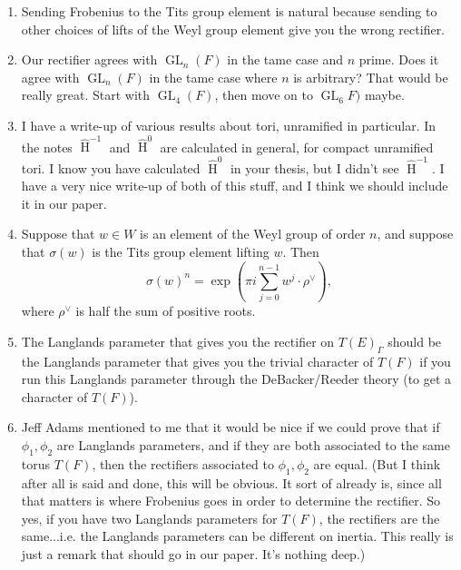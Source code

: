 \documentclass{article}
\DeclareMathOperator{\HH}{H}
\DeclareMathOperator{\GL}{GL}
\newcommand{\HT}[1]{\widehat{\HH}^{#1}}
\begin{document}
\begin{enumerate}
\item Sending Frobenius to the Tits group element is natural because sending to other choices of lifts of the Weyl group element give you the wrong rectifier.

\item Our rectifier agrees with $\GL_n(F)$ in the tame case and $n$ prime.  Does it agree with $\GL_n(F)$ in the tame case where $n$ is arbitrary?  That would be really great.  Start with $\GL_4(F)$, then move on to $\GL_6F)$ maybe.

\item I have a write-up of various results about tori, unramified in particular.  In the notes $\HT{-1}$ and $\HT{0}$ are calculated in general, for compact unramified tori.  I know you have calculated $\HT{0}$ in your thesis, but I didn't see $\HT{-1}$.  I have a very nice write-up of both of this stuff, and I think we should include it in our paper.

\item Suppose that $w \in W$ is an element of the Weyl group of order $n$, and suppose that $\sigma(w)$ is the Tits group element lifting $w$.  Then
$$\sigma(w)^n = \exp\left(\pi i \sum_{j=0}^{n-1} w^j \cdot \rho^\vee\right),$$
where $\rho^{\vee}$ is half the sum of positive roots.

\item The Langlands parameter that gives you the rectifier on $T(E)_{\Gamma}$ should be the Langlands parameter that gives you the trivial character of $T(F)$ if you run this Langlands parameter through the DeBacker/Reeder theory (to get a character of $T(F)$).

\item Jeff Adams mentioned to me that it would be nice if we could prove that if $\phi_1, \phi_2$ are Langlands parameters, and if they are both associated to the same torus $T(F)$, then the rectifiers associated to $\phi_1, \phi_2$ are equal.  (But I think after all is said and done, this will be obvious.  It sort of already is, since all that matters is where Frobenius goes in order to determine the rectifier.  So yes, if you have two Langlands parameters for $T(F)$, the rectifiers are the same...i.e. the Langlands parameters can be different on inertia.  This really is just a remark that should go in our paper.  It's nothing deep.)

\end{enumerate}
\end{document}
